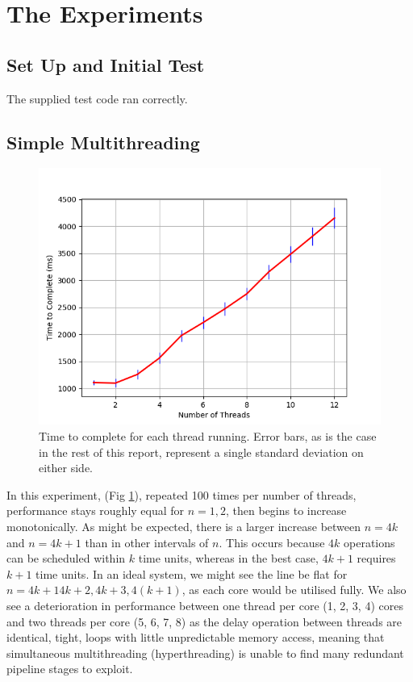 \documentclass[11pt]{article}
\begin{document}
\section{The Experiments}
\subsection{Set Up and Initial Test}
The supplied test code ran correctly.
\subsection{Simple Multithreading}
\begin{figure}\label{fig:step2_1}
\centering
\includegraphics[scale=0.65]{step2.png}
 \caption{Time to complete for each thread running. Error bars, as is the case in the rest of this report, represent a single standard deviation on either side.}
\end{figure}

In this experiment, (Fig \ref{fig:step2_1}), repeated 100 times per number of threads, performance stays roughly equal for $n = 1, 2$, then begins to increase monotonically. As might be expected, there is a larger increase between $n= 4k$ and $n= 4k +1$ than in other intervals of $n$. This occurs because $4k$ operations can be scheduled within $k$ time units, whereas in the best case, $4k+1$ requires $k+1$ time units. In an ideal system, we might see the line be flat for $n = 4k+1 4k+2, 4k+3, 4(k+1)$, as each core would be utilised fully. We also see a deterioration in performance between one thread per core (1, 2, 3, 4) cores and two threads per core (5, 6, 7, 8) as the delay operation between threads are identical, tight, loops with little unpredictable memory access, meaning that simultaneous multithreading (hyperthreading) is unable to find many redundant pipeline stages to exploit.
\end{document}
